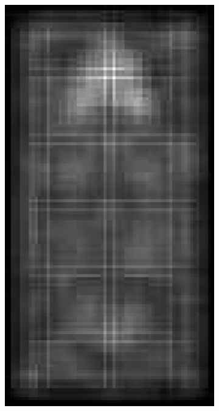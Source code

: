 \documentclass[thesis.tex]{subfiles}
\begin{document}
\begin{figure}[tb]
{\begin{subfigure}[t]{0.1635\textwidth}
		\caption{}
		\label{fig:inriaPosTrainMeanM}
		\vspace{2mm}
	\end{subfigure}
	\begin{subfigure}[t]{0.17\textwidth}
		\includegraphics[width=\textwidth]{img/inriaExampleDescriptorSvmMax.pdf}
		\caption{}
		\label{fig:inriaExampleDescriptorSvmMax}

\end{subfigure}}
\end{figure}
\end{document}
